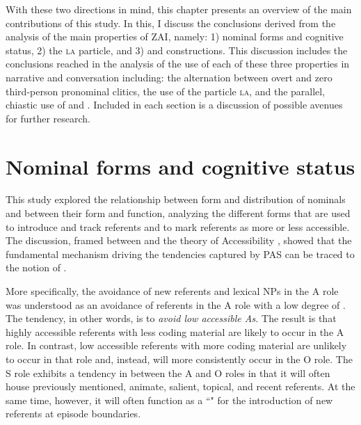 With these two directions in mind, this chapter presents an overview of the main contributions of this study. In this, I discuss the conclusions derived from the analysis of the main  properties of ZAI, namely: 1) nominal forms and cognitive status, 2) the \textsc{la} particle, and 3)  and  constructions. This discussion includes the conclusions reached in the analysis of the use of each of these three properties in narrative and conversation including: the alternation between overt and zero third-person pronominal clitics, the use of the particle \textsc{la}, and the parallel, chiastic use of  and . Included in each section is a discussion of possible avenues for further research.




\section{Nominal forms and cognitive status}

This study explored the relationship between form and distribution of nominals and between their form and function, analyzing the different forms that are used to introduce and track referents and to mark referents as more or less accessible. The discussion, framed between  \citep{dubois2003} and the theory of Accessibility \citep{ariel2001}, showed that the fundamental mechanism driving the tendencies captured by PAS can be traced to the notion of . 

More specifically, the avoidance of new referents and lexical NPs in the A role was understood as an avoidance of referents in the A role with a low degree of . The tendency, in other words, is to \textit{avoid low accessible As.} The result is that highly accessible referents with less coding material are likely to occur in the A role. In contrast, low accessible referents with more coding material are unlikely to occur in that role and, instead, will more consistently occur in the O role. The S role exhibits a tendency in between the A and O roles in that it will often house previously mentioned, animate, salient, topical, and recent referents. At the same time, however, it will often function as a ``" for the introduction of new referents at episode boundaries.

